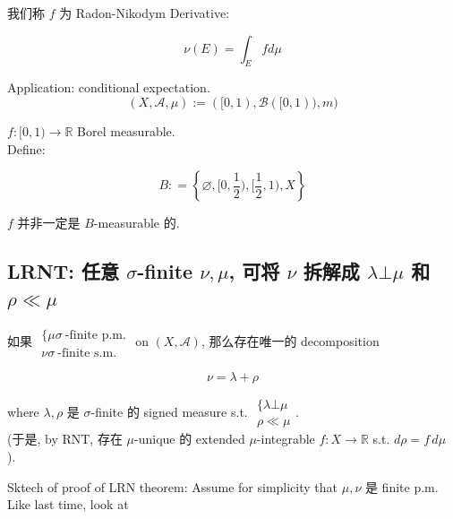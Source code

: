 我们称 \(f\) 为 Radon-Nikodym Derivative:

\[\nu(E) = \int_{E}f d\mu\]

\begin{example}

Application: conditional expectation.\\

\[(X,\mathcal{A},\mu) := (\lbrack 0,1),\mathcal{B}(\lbrack 0,1)),m)\]

\(f:\lbrack 0,1)\rightarrow\mathbb{R}\) Borel measurable.\\
Define:

\[B: = \left\{ {\varnothing,\lbrack 0,\frac{1}{2}),\lbrack\frac{1}{2},1),X} \right\}\]

\(f\) 并非一定是 \(B\)-measurable 的.

\end{example}

\subsection{\texorpdfstring{LRNT: 任意 \(\sigma\)-finite \(\nu,\mu\), 可将 \(\nu\) 拆解成 \(\lambda\bot\mu\) 和 \(\rho \ll \mu\)}{LRNT: 任意 \textbackslash sigma-finite \textbackslash nu,\textbackslash mu, 可将 \textbackslash nu 拆解成 \textbackslash lambda\textbackslash bot\textbackslash mu 和 \textbackslash rho \textbackslash ll \textbackslash mu}}

\begin{theorem}{}

如果 \(\begin{matrix}
{\{\mu\sigma\ \text{-finite p.m.}} \\
{\nu\sigma\ \text{-finite s.m.}}
\end{matrix}\) on \((X,\mathcal{A})\), 那么存在唯一的 decomposition

\[\nu = \lambda + \rho\]

where \(\lambda,\rho\) 是 \(\sigma\)-finite 的 signed measure s.t. \(\begin{matrix}
{\{\lambda\bot\mu} \\
{\rho \ll \mu}
\end{matrix}\).\\
(于是, by RNT, 存在 \(\mu\)-unique 的 extended \(\mu\)-integrable \(f:X\rightarrow\mathbb{R}\) s.t. \(d\rho = f\, d\mu\) ).

\end{theorem}

Sktech of proof of LRN theorem: Assume for simplicity that \(\mu,\nu\) 是 finite p.m.\\
Like last time, look at

